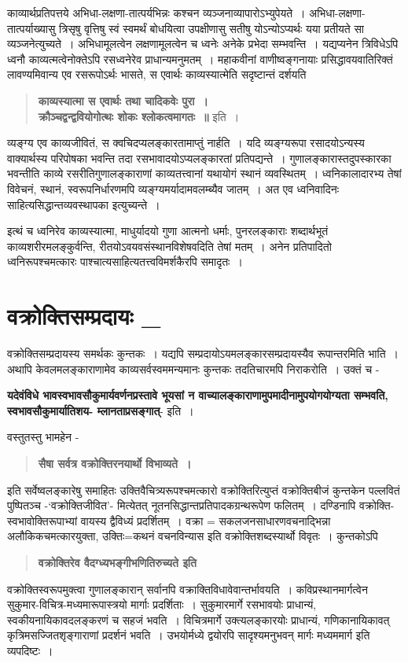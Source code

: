 {काव्यार्थप्रतिपत्तये अभिधा-लक्षणा-तात्पर्यभिन्नः कश्चन व्यञ्जनाव्यापारोऽभ्युपेयते~। अभिधा-लक्षणा-तात्पर्याख्यासु त्रिसृषु वृत्तिषु स्वं स्वमर्थं बोधयित्वा उपक्षीणासु सतीषु योऽन्योऽप्यर्थः यया प्रतीयते सा व्यञ्जनेत्युच्यते~। अभिधामूलत्वेन लक्षणामूलत्वेन च ध्वनेः अनेके प्रभेदा सम्भवन्ति~। यद्यप्यनेन त्रिविधेऽपि ध्वनौ काव्यत्मत्वेनोक्तेऽपि रसध्वनेरेव प्राधान्यमनुमतम्~। महाकवीनां वाणीष्वङ्गनायाः प्रसिद्धावयवातिरिक्तं लावण्यमिवान्य एव रसरूपोऽर्थः भासते, स एवार्थः काव्यस्यात्मेति सदृष्टान्तं दर्शयति 

\begin{verse}
\textbf{काव्यस्यात्मा स एवार्थः तथा चादिकवेः पुरा~। \\
क्रौञ्चद्वन्द्ववियोगोत्थः शोकः श्लोकत्वमागतः~॥} इति~। 
\end{verse}
व्यङ्ग्य एव काव्यजीवितं, स क्वचिदप्यलङ्कारतामाप्तुं नार्हति~। यदि व्यङ्ग्यरूपा रसादयोऽन्यस्य वाक्यार्थस्य परिपोषका भवन्ति तदा रसभावादयोऽप्यलङ्कारतां प्रतिपद्यन्ते~। गुणालङ्कारास्तदुपस्कारका भवन्तीति काव्ये रसरीतिगुणालङ्काराणां काव्यतत्त्वानां यथायोगं स्थानं व्यवस्थितम्~। ध्वनिकालादारभ्य तेषां विवेचनं, स्थानं, स्वरूपनिर्धारणमपि व्यङ्ग्यमर्यादामवलम्ब्यैव जातम्~। अत एव ध्वनिवादिनः साहित्यसिद्धान्तव्यवस्थापका इत्युच्यन्ते~। 

इत्थं च ध्वनिरेव काव्यस्यात्मा, माधुर्यादयो गुणा आत्मनो धर्माः, पुनरलङ्काराः शब्दार्थभूतं काव्यशरीरमलङ्कुर्वन्ति, रीतयोऽवयवसंस्थानविशेषवदिति तेषां मतम्~। अनेन प्रतिपादितो ध्वनिरूपश्चमत्कारः पाश्चात्यसाहित्यतत्त्वविमर्शकैरपि समादृतः~। 

\section*{ वक्रोक्तिसम्प्रदायः \_} 

वक्रोक्तिसम्प्रदायस्य समर्थकः कुन्तकः~। यद्यपि सम्प्रदायोऽयमलङ्कारसम्प्रदायस्यैव रूपान्तरमिति भाति~। अथापि केवलमलङ्काराणामेव काव्यसर्वस्वममन्यमानः कुन्तकः तदतिचारमपि निराकरोति~। उक्तं च - 

\textbf{यदेवंविधे भावस्वभावसौकुमार्यवर्णनप्रस्तावे भूयसां न वाच्यालङ्काराणामुपमादीनामुपयोगयोग्यता सम्भवति, स्वभावसौ\-कुमार्यातिशय- म्लानताप्रसङ्गात्}- इति~। 

वस्तुतस्तु भामहेन - 
\begin{verse}
\textbf{सैषा सर्वत्र वक्रोक्तिरनयार्थो विभाव्यते~। }
\end{verse}
इति सर्वेष्वलङ्कारेषु समाहितः उक्तिवैचित्र्यरूपश्चमत्कारो वक्रोक्तिरित्युप्तं वक्रोक्तिबीजं कुन्तकेन पल्लवितं पुष्पितञ्च -‘वक्रोक्तिजीवित’- मित्येतत् नूतनसिद्धान्तप्रतिपादकग्रन्थरूपेण फलितम्~। दण्डिनापि वक्रोक्ति-स्वभावोक्तिरूपाभ्यां वायस्य द्वैविध्यं प्रदर्शितम्~। वक्रा = सकलजनसाधारणवचनाद्भिन्ना अलौकिकचमत्कारयुक्ता, उक्तिः=कथनं वचनविन्यास इति वक्रोक्तिशब्दस्यार्थो विवृतः~। कुन्तकोऽपि
\begin{verse}
\textbf{वक्रोक्तिरेव वैदग्ध्यभङ्गीभणितिरुच्यते इति }
\end{verse}
वक्रोक्तिस्वरूपमुक्त्वा गुणालङ्कारान् सर्वानपि वक्राक्तिविधावेवान्तर्भावयति~। कविप्रस्थान\-मार्गत्वेन सुकुमार-विचित्र-मध्यमारूपास्त्रयो मार्गाः प्रदर्शिताः~। सुकुमारमार्गे रसभावयोः प्राधान्यं, स्वकीयनायिकावदलङ्करणं च सहजं भवति~। विचित्रमार्गे उक्त्यलङ्कारयोः प्राधान्यं, गणिकानायिकावत् कृत्रिमसज्जितशृङ्गाराणां प्रदर्शनं भवति~। उभयोर्मध्ये द्वयोरपि सादृश्यमनुभवन् मार्गः मध्यममार्ग इति व्यपदिष्टः~। 

}
